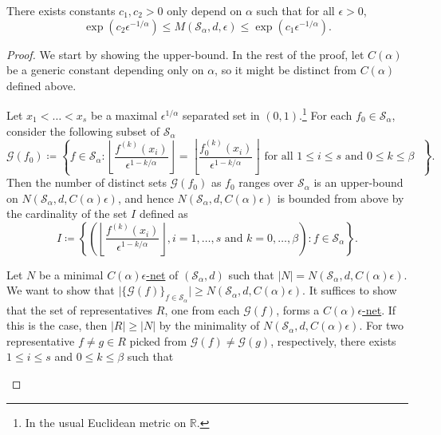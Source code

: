 \begin{theorem}\label{pf-thm:metric-entropy}
	There exists constants \(c_1, c_2 > 0\) only depend on \(\alpha \) such that for all \(\epsilon > 0\),
	\[
		\exp \left( c_2 \epsilon ^{-1 / \alpha } \right)
		\leq M(\mathcal{S} _\alpha , d, \epsilon )
		\leq \exp \left( c_1 \epsilon ^{-1 / \alpha } \right) .
	\]
\end{theorem}
\begin{proof}
	We start by showing the upper-bound. In the rest of the proof, let \(C(\alpha )\) be a generic constant depending only on \(\alpha \), so it might be distinct from \(C(\alpha )\) defined above.

	\begin{claim}\label{clm:metric-entropy-a}
		Let \(x_1 < \dots < x_s\) be a maximal \(\epsilon ^{1 / \alpha }\) separated set in \((0, 1)\).\footnote{In the usual Euclidean metric on \(\mathbb{R} \).} For each \(f_0 \in \mathcal{S} _\alpha \), consider the following subset of \(\mathcal{S} _\alpha \)
		\[
			\mathcal{G} (f_0) \coloneqq \left\{ f\in \mathcal{S} _\alpha \colon \left\lfloor \frac{f^{(k)}(x_i)}{\epsilon ^{1 - k / \alpha }} \right\rfloor = \left\lfloor \frac{f_0^{(k)}(x_i)}{\epsilon ^{1 - k / \alpha }} \right\rfloor \text{ for all \(1 \leq i \leq s\) and \(0 \leq k \leq \beta \) } \right\}.
		\]
		Then the number of distinct sets \(\mathcal{G} (f_0)\) as \(f_0\) ranges over \(\mathcal{S} _\alpha \) is an upper-bound on \(N(\mathcal{S} _\alpha , d, C(\alpha )\epsilon )\), and hence \(N(\mathcal{S} _\alpha , d, C(\alpha )\epsilon )\) is bounded from above by the cardinality of the set \(I\) defined as
		\[
			I \coloneqq \left\{ \left( \left\lfloor \frac{f^{(k)}(x_i)}{\epsilon ^{1 - k / \alpha }} \right\rfloor,i = 1, \dots , s \text{ and } k = 0, \dots , \beta  \right) \colon f\in \mathcal{S} _\alpha  \right\}.
		\]
	\end{claim}
	\begin{explanation}
		Let \(N\) be a minimal \hyperref[def:eps-net]{\(C(\alpha )\epsilon \)-net} of \((\mathcal{S} _\alpha , d )\) such that \(\vert N \vert = N(\mathcal{S} _\alpha , d, C(\alpha )\epsilon)\). We want to show that \(\vert \{ \mathcal{G} (f) \}_{f\in \mathcal{S} _\alpha } \vert \geq N(\mathcal{S} _\alpha , d, C(\alpha )\epsilon )\). It suffices to show that the set of representatives \(R\), one from each \(\mathcal{G} (f)\), forms a \hyperref[def:eps-net]{\(C(\alpha )\epsilon \)-net}. If this is the case, then \(\vert R \vert \geq \vert N \vert \) by the minimality of \(N(\mathcal{S} _\alpha , d , C(\alpha )\epsilon)\). For two representative \(f \neq g \in R\) picked from \(\mathcal{G} (f) \neq \mathcal{G} (g)\), respectively, there exists \(1 \leq i \leq s\) and \(0 \leq k \leq \beta \) such that

\end{explanation}
\end{proof}
